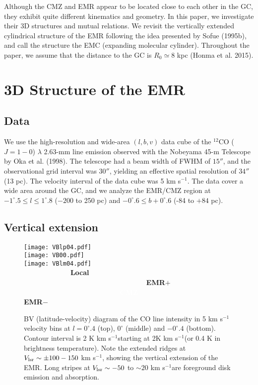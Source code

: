 \documentclass[useAMS,usenatbib]{mn2e}
\def\kms{km s$^{-1}$}
\def\vlsr{V_{\rm lsr}}
\def\deg{^\circ}\def\Deg{^\circ}
\begin{document}
Although the CMZ and EMR appear to be located close to each other in the GC, they exhibit quite different kinematics and geometry. In this paper, we investigate their 3D structures and mutual relations. We revisit the vertically extended cylindrical structure of the EMR following the idea presented by Sofue (1995b), and call the structure the EMC (expanding molecular cylinder). Throughout the paper, we assume that the distance to the GC is $R_0\simeq 8$ kpc (Honma et al. 2015). 

\section{3D Structure of the EMR}
 
\subsection{Data}
We use the high-resolution and wide-area $(l,b,v)$ data cube of the $^{12}$CO ($J=1-0$) $\lambda$ 2.63-mm line emission observed with the Nobeyama 45-m Telescope by Oka et al. (1998). The telescope had a beam width of FWHM of $15''$, and the observational grid interval was $30''$, yielding an effective spatial resolution of $34''$ (13 pc). The velocity interval of the data cube was 5 \kms. The data cover a wide area around the GC, and we analyze the EMR/CMZ region at $-1\deg.5 \le l \le 1\deg.8$ ($-200$ to 250 pc) and $-0\deg.6 \le b +0\deg.6$ (-84 to $+84$ pc). 

\subsection{Vertical extension}

\begin{figure} 
\begin{center} 
\texttt{[image: VBlp04.pdf]} \\ 
\texttt{[image: VB00.pdf]}  \\
\texttt{[image: VBlm04.pdf]}  \\ 
\vskip -171mm
{\bf ~~~~~~~~~~~ Local ~~~~~~~~~~~~~~~~~~~~}\\
{\bf ~~~~~~~~~~~~~~~~~~~~~~~~~~~~~~ EMR$+$}\\
\vskip 16mm
{\bf ~~~~~~~~~~~~~~~~~~~~~~~~\textcolor{white}{CMZ} ~~~~~~~~}\\
\vskip 12mm
{\bf EMR$-$ ~~~~~~~~~~~~~~~~~~~~~~~~~~~ }\\
\vskip 130mm
\end{center}
\caption{BV (latitude-velocity) diagram of the CO line intensity in 5 \kms velocity bins at 
 $l=0\deg.4$ (top), $0\deg$ (middle) and  
$-0\deg.4$ (bottom). Contour interval is 2 K \kms starting at 2K \kms (or 0.4 K in brightness temperature). Note the extended ridges at $\vlsr \sim \pm 100-150$ \kms, showing the vertical extension of the EMR. Long stripes at $\vlsr\sim -50$ to $\sim 20$ \kms are foreground disk emission and absorption.}
 \label{BVD}  
\end{figure}  
 
\end{document}
